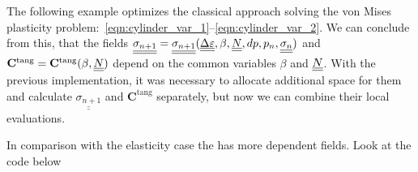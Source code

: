 \documentclass[12pt]{article}
\newcommand{\todolink}{\todo[fancyline, size=\scriptsize]{TOCITE}}
\begin{document}
The following example optimizes the classical approach solving the von Mises plasticity problem:~\ref{eqn:cylinder_var_1}--\ref{eqn:cylinder_var_2}.
We can conclude from this, that the fields $\underline{\underline{\sigma_{n+1}}} = \underline{\underline{\sigma_{n+1}}}(\underline{\underline{\Delta\varepsilon}}, \beta, \underline{\underline{N}}, dp, p_n, \underline{\underline{\sigma_n}})$ and $\mathbf{C}^\text{tang} = \mathbf{C}^\text{tang}(\beta, \underline{\underline{N}})$ depend on the common variables $\beta$ and $\underline{\underline{N}}$. With the previous implementation, it was necessary to allocate additional space for them and calculate $\underline{\underline{\sigma_{n+1}}}$ and $\mathbf{C}^\text{tang}$ separately, but now we can combine their local evaluations.

In comparison with the elasticity case the   has more dependent fields. Look at the code below
\end{document}
